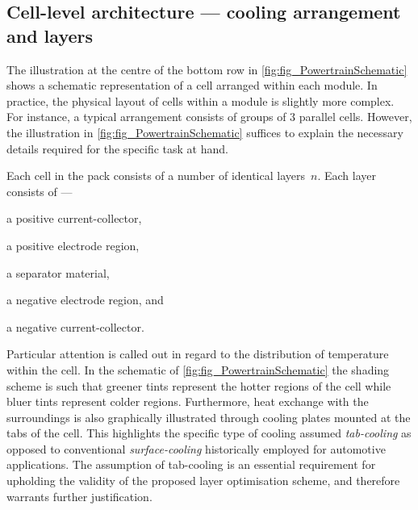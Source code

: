 \subsection{Cell-level architecture --- cooling arrangement and layers}

The    illustration    at     the    centre    of    the     bottom    row    in
\cref{fig:fig_PowertrainSchematic} shows  a schematic  representation of  a cell
arranged within  each module. In practice,  the physical layout of  cells within
a  module  is  slightly  more  complex.  For  instance,  a  typical  arrangement
consists  of  groups   of  3  parallel  cells.  However,   the  illustration  in
\cref{fig:fig_PowertrainSchematic}  suffices to  explain  the necessary  details
required for the specific task at hand.

Each cell in the pack consists of a number of identical layers~$n$. Each layer
consists of ---
\begin{enumerate*}[label=\roman*)]
    \item a positive current-collector,
    \item a positive electrode region,
    \item a separator material,
    \item a negative electrode region, and
    \item a negative current-collector.
\end{enumerate*}
Particular attention is called out in  regard to the distribution of temperature
within  the cell.  In  the schematic  of \cref{fig:fig_PowertrainSchematic}  the
shading scheme  is such that greener  tints represent the hotter  regions of the
cell while bluer tints represent colder regions. Furthermore, heat exchange with
the surroundings is also graphically  illustrated through cooling plates mounted
at the tabs  of the cell. This  highlights the specific type  of cooling assumed
\viz{}  \emph{tab-cooling}  as  opposed to  conventional  \emph{surface-cooling}
historically employed for automotive applications. The assumption of tab-cooling
is an  essential requirement for  upholding the  validity of the  proposed layer
optimisation scheme, and therefore warrants further justification.

